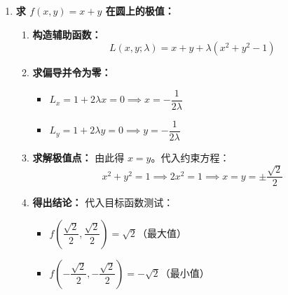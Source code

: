 \documentclass[lang=cn,11pt]{elegantbook}
\begin{document}
\begin{solution}
\begin{enumerate}
  \item[(1)] \textbf{求 $f(x,y)=x+y$ 在圆上的极值：}
  \begin{enumerate}
    \item \textbf{构造辅助函数：}
    \[
    L(x,y;\lambda) = x+y+\lambda(x^2+y^2-1)
    \]
    \item \textbf{求偏导并令为零：}
    \begin{itemize}
      \item $L_x = 1+2\lambda x = 0 \implies x = -\dfrac{1}{2\lambda}$
      \item $L_y = 1+2\lambda y = 0 \implies y = -\dfrac{1}{2\lambda}$
    \end{itemize}
    \item \textbf{求解极值点：}
    由此得 $x=y$。代入约束方程：
    \[
    x^2+y^2=1 \implies 2x^2=1 \implies x=y=\pm \frac{\sqrt{2}}{2}
    \]
    \item \textbf{得出结论：}
    代入目标函数测试：
    \begin{itemize}
      \item $f\left(\dfrac{\sqrt{2}}{2}, \dfrac{\sqrt{2}}{2}\right) = \sqrt{2}$（最大值）
      \item $f\left(-\dfrac{\sqrt{2}}{2}, -\dfrac{\sqrt{2}}{2}\right) = -\sqrt{2}$（最小值）
    \end{itemize}
  \end{enumerate}


\end{enumerate}
\end{solution}
\end{document}
